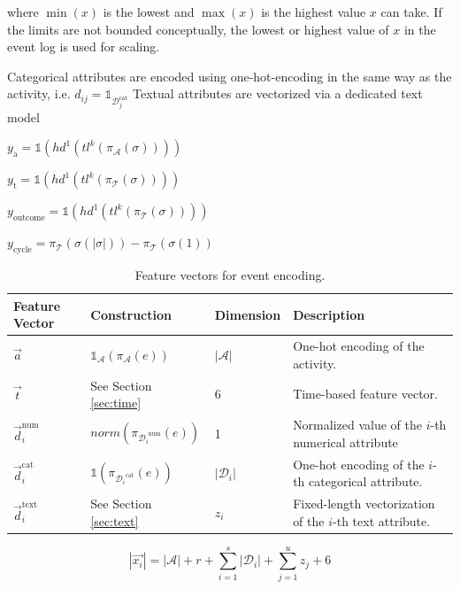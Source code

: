 where $\min(x)$ is the lowest and $\max(x)$ is the highest value $x$ can take.
If the limits are not bounded conceptually, the lowest or highest value of $x$ in the event log is used for scaling.

Categorical attributes are encoded using one-hot-encoding in the same way as the activity, i.e. $d_{ij} = \mathds{1}_{\mathcal{D}_j^{\mathrm{cat}}}$
Textual attributes are vectorized via a dedicated text model 

$y_\mathrm{a} = \mathds{1}(hd^1(tl^k(\pi_\mathcal{A}(\sigma))))$

$y_\mathrm{t} = \mathds{1}(hd^1(tl^k(\pi_\mathcal{T}(\sigma))))$

$y_\mathrm{outcome} = \mathds{1}(hd^1(tl^k(\pi_\mathcal{T}(\sigma))))$

$y_\mathrm{cycle} =  \pi_\mathcal{T}(\sigma(|\sigma|))-  \pi_\mathcal{T}(\sigma(1))$




\begin{table}[!htbp]
\renewcommand{\arraystretch}{1.2}
\begin{tabularx}{\textwidth}{p{2cm} l l p{6.8cm} }
	\toprule
	 \textbf{Feature} \newline \textbf{Vector} & \textbf{Construction} &\textbf{Dimension} &  \textbf{Description} \\
	 \midrule
	 	$\vec{a}$ &$\mathds{1}_\mathcal{A}(\pi_\mathcal{A}(e))$& $|\mathcal{A}|$& One-hot encoding of the activity. \\
	 	$\vec{t}$ & See Section \ref{sec:time} &6 & Time-based feature vector.\\
	 	$\vec{d}_i^\mathrm{num}$ &  $norm(\pi_{{\mathcal{D}_i}^\mathrm{num}}(e)) $ &1 & Normalized value of the $i$-th numerical attribute\\
	 	$\vec{d}_i^\mathrm{cat}$ & $\mathds{1}(\pi_{{\mathcal{D}_i}^\mathrm{cat}}(e))$&$|\mathcal{D}_i|$ & One-hot encoding of the $i$-th categorical attribute.\\
	 	$\vec{d}_i^\mathrm{text}$ & See Section \ref{sec:text} & $z_i$& Fixed-length vectorization of the $i$-th text attribute.\\
	\bottomrule
\end{tabularx}
	\caption{Feature vectors for event encoding.}
	\label{tab:features}
\end{table}

\begin{equation}
	|\vec{x_i}|= |\mathcal{A}| + r + \sum_{i=1}^{s} |\mathcal{D}_i| + \sum_{j=1}^{u} z_j + 6
\end{equation}


